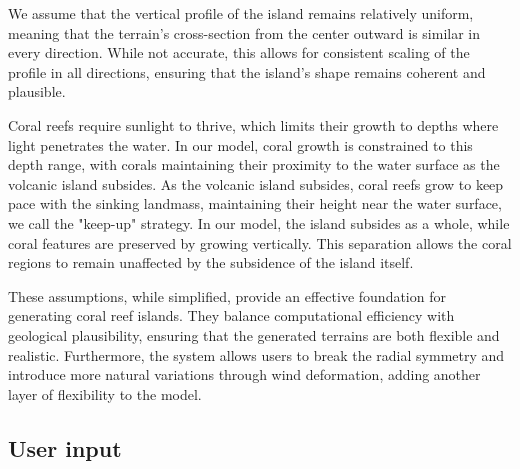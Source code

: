 \begin{Itemize}
         We assume that the vertical profile of the island remains relatively uniform, meaning that the terrain's cross-section from the center outward is similar in every direction. While not accurate, this allows for consistent scaling of the profile in all directions, ensuring that the island's shape remains coherent and plausible. %

         Coral reefs require sunlight to thrive, which limits their growth to depths where light penetrates the water. In our model, coral growth is constrained to this depth range, with corals maintaining their proximity to the water surface as the volcanic island subsides.
         As the volcanic island subsides, coral reefs grow to keep pace with the sinking landmass, maintaining their height near the water surface, we call the "keep-up" strategy. In our model, the island subsides as a whole, while coral features are preserved by growing vertically. This separation allows the coral regions to remain unaffected by the subsidence of the island itself. %
\end{Itemize}

These assumptions, while simplified, provide an effective foundation for generating coral reef islands. They balance computational efficiency with geological plausibility, ensuring that the generated terrains are both flexible and realistic. Furthermore, the system allows users to break the radial symmetry and introduce more natural variations through wind deformation, adding another layer of flexibility to the model.


\subsection{User input}

